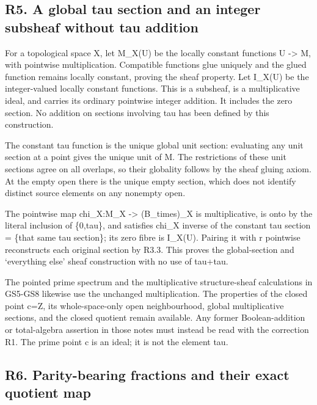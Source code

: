 \documentclass[
]{article}
\newcounter{none} %
\begin{document}
\subsection{R5. A global tau section and an integer subsheaf without tau
addition}\label{r5.-a-global-tau-section-and-an-integer-subsheaf-without-tau-addition}

For a topological space X, let M\_X(U) be the locally constant functions
U -\textgreater{} M, with pointwise multiplication. Compatible functions
glue uniquely and the glued function remains locally constant, proving
the sheaf property. Let I\_X(U) be the integer-valued locally constant
functions. This is a subsheaf, is a multiplicative ideal, and carries
its ordinary pointwise integer addition. It includes the zero section.
No addition on sections involving tau has been defined by this
construction.

The constant tau function is the unique global unit section: evaluating
any unit section at a point gives the unique unit of M. The restrictions
of these unit sections agree on all overlaps, so their globality follows
by the sheaf gluing axiom. At the empty open there is the unique empty
section, which does not identify distinct source elements on any
nonempty open.

The pointwise map chi\_X:M\_X -\textgreater{} (B\_times)\_X is
multiplicative, is onto by the literal inclusion of \{0,tau\}, and
satisfies chi\_X inverse of the constant tau section = \{that same tau
section\}; its zero fibre is I\_X(U). Pairing it with r pointwise
reconstructs each original section by R3.3. This proves the
global-section and `everything else' sheaf construction with no use of
tau+tau.

The pointed prime spectrum and the multiplicative structure-sheaf
calculations in GS5-GS8 likewise use the unchanged multiplication. The
properties of the closed point c=Z, its whole-space-only open
neighbourhood, global multiplicative sections, and the closed quotient
remain available. Any former Boolean-addition or total-algebra assertion
in those notes must instead be read with the correction R1. The prime
point c is an ideal; it is not the element tau.

\subsection{R6. Parity-bearing fractions and their exact quotient
map}\label{r6.-parity-bearing-fractions-and-their-exact-quotient-map}
\end{document}
